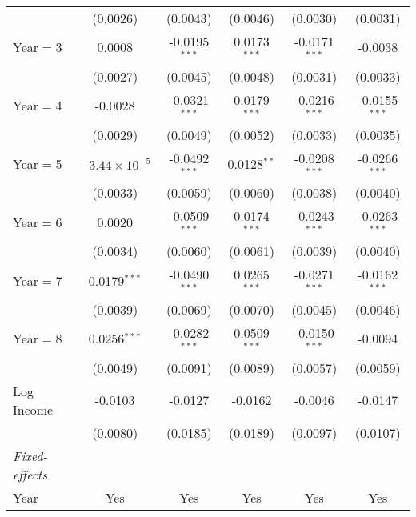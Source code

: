 \begin{table}[htbp]
\begin{tabular}{lccccc}
                           & (0.0026)               & (0.0043)        & (0.0046)       & (0.0030)        & (0.0031)\\
      Year$=$3             & 0.0008                 & -0.0195$^{***}$ & 0.0173$^{***}$ & -0.0171$^{***}$ & -0.0038\\
                           & (0.0027)               & (0.0045)        & (0.0048)       & (0.0031)        & (0.0033)\\
      Year$=$4             & -0.0028                & -0.0321$^{***}$ & 0.0179$^{***}$ & -0.0216$^{***}$ & -0.0155$^{***}$\\
                           & (0.0029)               & (0.0049)        & (0.0052)       & (0.0033)        & (0.0035)\\
      Year$=$5             & $-3.44\times 10^{-5}$ & -0.0492$^{***}$ & 0.0128$^{**}$  & -0.0208$^{***}$ & -0.0266$^{***}$\\
                           & (0.0033)               & (0.0059)        & (0.0060)       & (0.0038)        & (0.0040)\\
      Year$=$6             & 0.0020                 & -0.0509$^{***}$ & 0.0174$^{***}$ & -0.0243$^{***}$ & -0.0263$^{***}$\\
                           & (0.0034)               & (0.0060)        & (0.0061)       & (0.0039)        & (0.0040)\\
      Year$=$7             & 0.0179$^{***}$         & -0.0490$^{***}$ & 0.0265$^{***}$ & -0.0271$^{***}$ & -0.0162$^{***}$\\
                           & (0.0039)               & (0.0069)        & (0.0070)       & (0.0045)        & (0.0046)\\
      Year$=$8             & 0.0256$^{***}$         & -0.0282$^{***}$ & 0.0509$^{***}$ & -0.0150$^{***}$ & -0.0094\\
                           & (0.0049)               & (0.0091)        & (0.0089)       & (0.0057)        & (0.0059)\\
      Log Income           & -0.0103                & -0.0127         & -0.0162        & -0.0046         & -0.0147\\
                           & (0.0080)               & (0.0185)        & (0.0189)       & (0.0097)        & (0.0107)\\
      \midrule \emph{Fixed-effects} &   &   &   &   &  \\
      Year                 & Yes                    & Yes             & Yes            & Yes             & Yes\\

\end{tabular}
\end{table}
